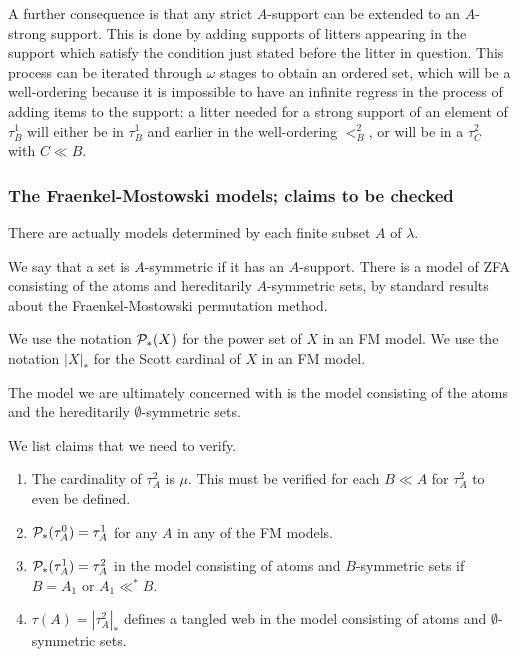 \documentclass[12pt]{article}
\begin{document}
A further consequence is that any strict $A$-support  can be extended to an $A$-strong support.  This is done by adding supports of litters appearing in the support which
satisfy the condition just stated before the litter in question.  This process can be iterated through $\omega$ stages to obtain an ordered set, which will be a well-ordering because it is impossible to have an infinite regress in the process of adding items to the support:  a litter  needed for a strong support of an element of $\tau^1_B$ will either be in $\tau^1_B$ and earlier in the well-ordering $<^2_B$, or will be in a $\tau^2_C$ with $C\ll B$.

\newpage

\subsubsection{The Fraenkel-Mostowski models; claims to be checked}

There are actually models determined by each finite subset $A$ of $\lambda$.

We say that a set is $A$-symmetric if it has an $A$-support.   There is a model of ZFA consisting of the atoms and hereditarily $A$-symmetric sets, by standard results about the
Fraenkel-Mostowski permutation method.

We use the notation ${\cal P}_*(X)$ for the power set of $X$ in an FM model.  We use the notation $|X|_*$ for the Scott cardinal of $X$ in an FM model.

The model we are ultimately concerned with is the model consisting of the atoms and the hereditarily $\emptyset$-symmetric sets.

We list claims that we need to verify.

\begin{enumerate}

\item The cardinality of $\tau^2_A$ is $\mu$.  This must be verified for each $B \ll A$ for $\tau^2_A$ to even be defined.

\item ${\cal P}_*(\tau^0_A) = \tau^1_A$  for any $A$ in any of the FM models.

\item ${\cal P}_*(\tau^1_A) = \tau^2_A$ in the model consisting of atoms and $B$-symmetric sets if $B=A_1$ or $A_1 \ll^* B$. 

\item $\tau(A) = |\tau^2_A|_*$ defines a tangled web in the model consisting of atoms and $\emptyset$-symmetric sets.

\end{enumerate}
\end{document}
